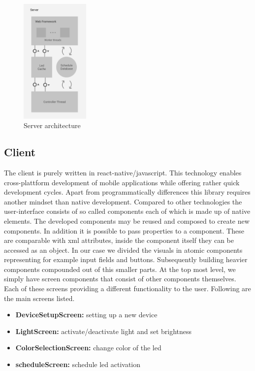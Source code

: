 \documentclass[conference]{IEEEtran}
\begin{document}
\begin{figure}[H]
   \centering
   \includegraphics[width=0.3\textwidth]{server_architecture}
   \caption{Server architecture}
   \label{serverArch}
\end{figure}

\subsection{Client}
The client is purely written in react-native/javascript. This technology enables cross-plattform development of mobile applications
while offering rather quick development cycles. Apart from programmatically differences this library requires another mindset than
native development. Compared to other technologies the user-interface consists of so called components each of which is made up of
native elements. The developed components may be reused and composed to create new components. In addition it is possible to pass
properties to a component. These are comparable with xml attributes, inside the component itself they can be accessed as an object.
In our case we divided the visuals in atomic components representing for example input fields and buttons. Subsequently building
heavier components compounded out of this smaller parts. At the top most level, we simply have screen components that consist of
other components themselves. Each of these screens providing a different functionality to the user. Following are the main screens
listed.

\vspace{5pt}
\begin{itemize}
   \item \textbf{DeviceSetupScreen:} setting up a new device
   \item \textbf{LightScreen:} activate/deactivate light and set brightness
   \item \textbf{ColorSelectionScreen:} change color of the led
   \item \textbf{scheduleScreen:} schedule led activation
\end{itemize}
\vspace{12pt}
\end{document}
